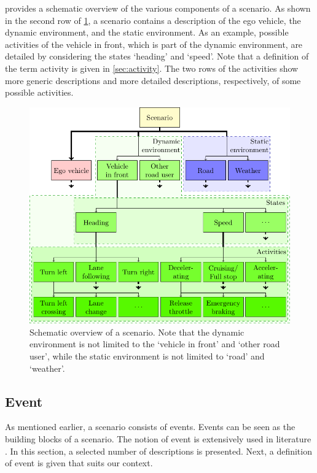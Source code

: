  provides a schematic overview of the various components of a scenario. As shown in the second row of \cref{fig:scenario}, a scenario contains a description of the ego vehicle, the dynamic environment, and the static environment. As an example, possible activities of the vehicle in front, which is part of the dynamic environment, are detailed by considering the states `heading' and `speed'. \cbstart Note that a definition of the term activity is given in \cref{sec:activity}\cbend. The two rows of the activities show more generic descriptions and more detailed descriptions, respectively, of some possible activities.

\begin{figure}
	\centering
	\includegraphics[width=\linewidth]{figures/scenario.pdf}%
	\caption{Schematic overview of a scenario. Note that the dynamic environment is not limited to the `vehicle in front' and `other road user', while the static environment is not limited to `road' and `weather'.}
	\label{fig:scenario}
\end{figure}



\subsection{Event}
\label{sec:event}
As mentioned earlier, a scenario consists of events. Events can be seen as the building blocks of a scenario. The notion of event is extensively used in literature \cite{breu1997towards, kim1993supervenience, pfeiffer2013concepts, branicky1998hybridcontrol, deschutter2000optimal, heemels2012eventcontrol}. In this section, a selected number of descriptions is presented. Next, a definition of event is given that suits our context.

